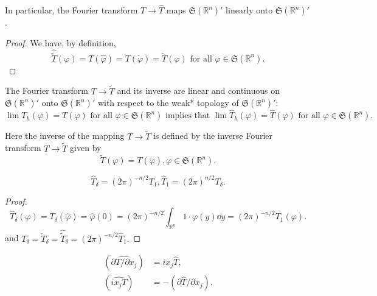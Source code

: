 In particular, the Fourier transform $T \to \hat{T}$ maps $\mathfrak{S}(\mathbb{R}^{n})'$ linearly onto $\mathfrak{S}(\mathbb{R}^{n})'$. 

\begin{proof}
 We have, by definition, 
\[
\hat {\tilde {T}} (\varphi) = T (\hat {\varphi}) = T (\check {\varphi}) = \check {T} (\varphi) \text{ for all } \varphi \in \mathfrak {S} (\mathbb{R}^{n}). \]
\end{proof}

\begin{corollary}\label{cor:VI.2.Corollary.2} The Fourier transform $T\to\tilde{T}$ and its inverse are linear and continuous on $\mathfrak{S}(\mathbb{R}^{n})'$ onto $\mathfrak{S}(\mathbb{R}^{n})'$ with respect to the weak* topology of $\mathfrak{S}(\mathbb{R}^{n})'$: 
\begin{equation}\lim T _{h} (\varphi) = T (\varphi) \text{ for all } \varphi \in \mathfrak {S} (\mathbb{R}^{n}) \text{ implies that } \lim \hat {T} _{h} (\varphi) = \hat {T} (\varphi) \text{ for all } \varphi \in \mathfrak {S} (\mathbb{R}^{n}). \label{eq:VI.2.15}\end{equation}
\end{corollary}

Here the inverse of the mapping $T \rightarrow \tilde{T}$ is defined by the inverse Fourier transform $T \rightarrow \tilde{T}$ given by 
\begin{equation}\tag{10'}\label{eq:VI.2.10'}
\tilde {T} (\varphi) = T (\tilde {\varphi}), \varphi \in \mathfrak {S} (\mathbb{R}^{n}).
\end{equation}

\begin{example}\label{ex:VI.2.Example.2a} 
\begin{equation}\hat {T} _{\delta} = (2 \pi) ^{-n/2} T _{1}, \hat {T} _{1} = (2 \pi) ^{n/2} T _{\delta}.\label{eq:VI.2.16}
\end{equation}
\end{example}

\begin{proof}
\[
 \hat {T} _{\delta} (\varphi) = T _{\delta} (\hat {\varphi}) = \hat {\varphi} (0) = (2 \pi) ^{-n/2} \int_ {\mathbb{R}^{n}} 1 \cdot \varphi (y) \dd y = (2\pi)^{-n/2}T_{1}(\varphi).
\]
and $T_{\delta} = \check{T}_{\delta} = \hat{\tilde{T}}_{\delta} = (2\pi)^{-n/2}\hat{T}_1.$ 
\end{proof}

\begin{example}\label{ex:VI.2.Example.3a} 
\begin{align}
(\widehat {\partial T / \partial x _{j}})& = i x _{j} \hat {T}, \label{eq:VI.2.17} \\
(\widehat {i x _{j} T})& = - (\partial \hat {T} / \partial x _{j}). \label{eq:VI.2.18}
\end{align}
\end{example}

